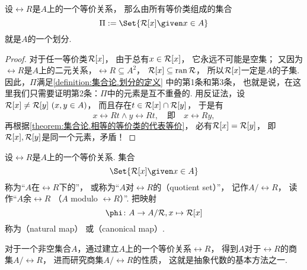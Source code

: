 \begin{theorem}
设\(\rel{R}\)是\(A\)上的一个等价关系，
那么由所有等价类组成的集合\begin{equation*}
	\Pi \defeq \Set{ \EquivalenceClassBH{x}[\rel{R}] \given x \in A }
\end{equation*}
就是\(A\)的一个划分.
\begin{proof}
对于任一等价类\(\EquivalenceClassBH{x}[\rel{R}]\)，
由于总有\(x \in \EquivalenceClassBH{x}[\rel{R}]\)，
它永远不可能是空集；
又因为\(\rel{R}\)是\(A\)上的二元关系，\(\rel{R} \subseteq A^2\)，
\(\EquivalenceClassBH{x}[\rel{R}] \subseteq \ran \rel{R}\)，
所以\(\EquivalenceClassBH{x}[\rel{R}]\)一定是\(A\)的子集.
因此，\(\Pi\)满足\cref{definition:集合论.划分的定义} 中的第1条和第3条，
也就是说，在这里我们只需要证明第2条：\(\Pi\)中的元素是互不重叠的.
用反证法，设\(\EquivalenceClassBH{x}[\rel{R}] \neq \rel{R}[y]\ (x,y \in A)\)，
而且存在\(t \in \EquivalenceClassBH{x}[\rel{R}] \cap \rel{R}[y]\)，
于是有\begin{equation*}
	x \rel{R} t \land y \rel{R} t,
	\quad\text{即}\quad
	x \rel{R} y,
\end{equation*}
再根据\cref{theorem:集合论.相等的等价类的代表等价}，
必有\(\EquivalenceClassBH{x}[\rel{R}] = \rel{R}[y]\)，
即\(\EquivalenceClassBH{x}[\rel{R}],\rel{R}[y]\)是同一个元素，矛盾！
\end{proof}
\end{theorem}

\begin{definition}\label{definition:集合论.商集的定义}
设\(\rel{R}\)是\(A\)上的一个等价关系.
集合\begin{equation*}
	\Set{ \EquivalenceClassBH{x}[\rel{R}] \given x \in A }
\end{equation*}称为“\(A\)在\(\rel{R}\)下的”，
或称为“\(A\)对\(\rel{R}\)的（quotient set）”，
记作\(A/\rel{R}\)，
读作“\(A\)余\(\rel{R}\)
（\(A\) modulo \(\rel{R}\)）”.
把映射\begin{equation*}
	\phi\colon A \to A/\rel{R}, x \mapsto \EquivalenceClassBH{x}[\rel{R}]
\end{equation*}称为（natural map）%
或（canonical map）.
\end{definition}
对于一个非空集合\(A\)，通过建立\(A\)上的一个等价关系\(\rel{R}\)，
得到\(A\)对于\(\rel{R}\)的商集\(A/\rel{R}\)，
进而研究商集\(A/\rel{R}\)的性质，
这就是抽象代数的基本方法之一.

